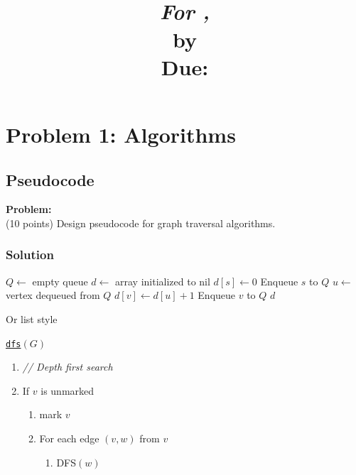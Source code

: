 \documentclass[notitlepage]{article}
\title{
  \vspace{2in}
  \begin{center}
    \textbf{\assignment}\\
    \vspace{0.1in}
    \large{\textit{For \class, \prof}}\\
    \vspace{0.1in}
    \large{\textbf{by \me}}\\
    \vspace{0.1in}
    \small{Due: \due}
  \end{center}
  \vspace{1in}
}
\author{}
\date{}
\begin{document}
\maketitle
\pagebreak

\tableofcontents
\pagebreak

\pagestyle{fancy}


\section{Problem 1: Algorithms}

\subsection{Pseudocode}

\begin{framed}
  \textbf{Problem:}\\
  (10 points) Design pseudocode for graph traversal algorithms.
\end{framed}

\subsubsection{Solution}

\begin{algorithm}[H]
  \begin{algorithmic}[1]
     
      \State $Q \gets$ empty queue
      \State $d \gets$ array initialized to nil
      \Statex
      \State $d[s] \gets 0$
      \State Enqueue $s$ to $Q$
      \Statex
        \State $u \gets$ vertex dequeued from $Q$
          \State $d[v] \gets d[u] + 1$
          \State Enqueue $v$ to $Q$
        \EndFor
      \EndWhile
      \State \Return $d$
    \EndFunction
    \end{algorithmic}
  \end{algorithm}

Or list style

\begin{framed}
  \underline{\texttt{dfs}$(G)$}
  \begin{enumerate}
    \item[] \textit{// Depth first search}
    \item If $v$ is unmarked
      \begin{enumerate}[label=\Alph*.]
        \item mark $v$
        \item For each edge $(v, w)$ from $v$
          \begin{enumerate}[label=(\roman*)]
            \item \textsc{DFS}$(w)$
          \end{enumerate}
      \end{enumerate}
  \end{enumerate}
\end{framed}
\end{document}

